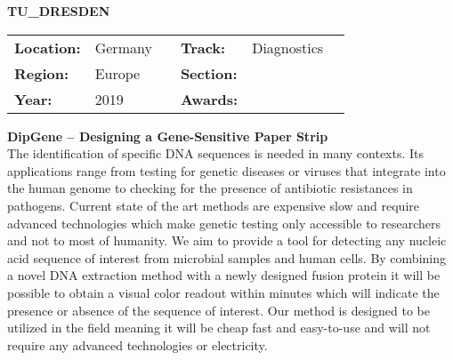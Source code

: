 \textbf{\uppercase{TU\_Dresden}} \FloatBarrier \begin{table}[h] \begin{tabular}{lp{2.5cm}llll} \textbf{Location:} & Germany & \multicolumn{1}{|l}{} & \textbf{Track:}   & Diagnostics \\ \textbf{Region:}   & Europe   & \multicolumn{1}{|l}{} & \textbf{Section:} &  \\ \textbf{Year:}     & 2019   & \multicolumn{1}{|l}{} & \textbf{Awards:}  & \end{tabular} \end{table} \FloatBarrier \noindent\textbf{DipGene – Designing a Gene-Sensitive Paper Strip} \vspace{.2cm}\\ 
The identification of specific DNA sequences is needed in many contexts. Its applications range from testing for genetic diseases or viruses that integrate into the human genome to checking for the presence of antibiotic resistances in pathogens. Current state of the art methods are expensive slow and require advanced technologies which make genetic testing only accessible to researchers and not to most of humanity. We aim to provide a tool for detecting any nucleic acid sequence of interest from microbial samples and human cells. By combining a novel DNA extraction method with a newly designed fusion protein it will be possible to obtain a visual color readout within minutes which will indicate the presence or absence of the sequence of interest. Our method is designed to be utilized in the field meaning it will be cheap fast and easy-to-use and will not require any advanced technologies or electricity. 
\vspace{2cm}

